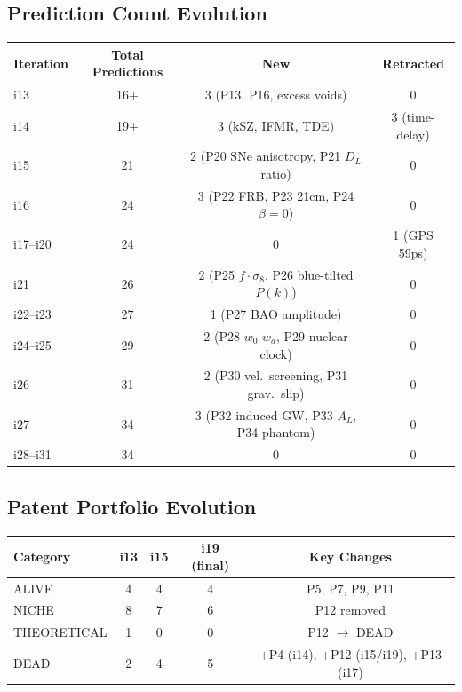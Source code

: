 \documentclass[11pt,a4paper]{article}
\begin{document}
\subsection{Prediction Count Evolution}

\begin{center}
\begin{tabular}{lccc}
\toprule
\textbf{Iteration} & \textbf{Total Predictions} & \textbf{New} & \textbf{Retracted} \\
\midrule
i13 & 16+ & 3 (P13, P16, excess voids) & 0 \\
i14 & 19+ & 3 (kSZ, IFMR, TDE) & 3 (time-delay) \\
i15 & 21 & 2 (P20 SNe anisotropy, P21 $D_L$ ratio) & 0 \\
i16 & 24 & 3 (P22 FRB, P23 21cm, P24 $\beta = 0$) & 0 \\
i17--i20 & 24 & 0 & 1 (GPS 59ps) \\
i21 & 26 & 2 (P25 $f \cdot \sigma_8$, P26 blue-tilted $P(k)$) & 0 \\
i22--i23 & 27 & 1 (P27 BAO amplitude) & 0 \\
i24--i25 & 29 & 2 (P28 $w_0$-$w_a$, P29 nuclear clock) & 0 \\
i26 & 31 & 2 (P30 vel.\ screening, P31 grav.\ slip) & 0 \\
i27 & 34 & 3 (P32 induced GW, P33 $A_L$, P34 phantom) & 0 \\
i28--i31 & 34 & 0 & 0 \\
\bottomrule
\end{tabular}
\end{center}

\subsection{Patent Portfolio Evolution}

\begin{center}
\begin{tabular}{lcccc}
\toprule
\textbf{Category} & \textbf{i13} & \textbf{i15} & \textbf{i19 (final)} & \textbf{Key Changes} \\
\midrule
ALIVE & 4 & 4 & 4 & P5, P7, P9, P11 \\
NICHE & 8 & 7 & 6 & P12 removed \\
THEORETICAL & 1 & 0 & 0 & P12 $\to$ DEAD \\
DEAD & 2 & 4 & 5 & +P4 (i14), +P12 (i15/i19), +P13 (i17) \\
\bottomrule
\end{tabular}
\end{center}
\end{document}
